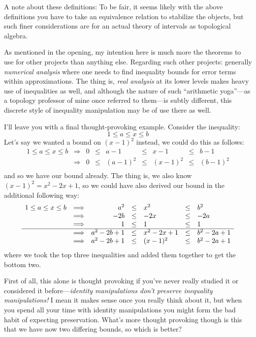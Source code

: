 \documentclass[twoside]{article}
\begin{document}
A note about these definitions: To be fair, it seems likely with the above definitions you have to take an equivalence
relation to stabilize the objects, but such finer considerations are for an actual theory of intervals as topological algebra.

\newpage

As mentioned in the opening, my intention here is much more the theorems to use for other projects than anything else.
Regarding such other projects: generally \emph{numerical analysis} where one needs to find inequality bounds for error
terms within approximations. The thing is, \emph{real analysis} at its lower levels makes heavy use of inequalities as
well, and although the nature of such ``arithmetic yoga''---as a topology professor of mine once referred to them---is
subtly different, this discrete style of inequality manipulation may be of use there as well.

I'll leave you with a final thought-provoking example. Consider the inequality:
$$ 1\le a\le x\le b $$
Let's say we wanted a bound on $ (x-1)^2 $ instead, we could do this as follows:
$$ \begin{array}{lcrclclcl}
1\le a\le x\le b	& \Longrightarrow & 0 & \le & a-1	& \le & x-1	& \le & b-1	\\
			& \Longrightarrow & 0 & \le & (a-1)^2	& \le & (x-1)^2	& \le & (b-1)^2	\\
\end{array} $$
and so we have our bound already. The thing is, we also know $ (x-1)^2=x^2-2x+1 $,
so we could have also derived our bound in the additional following way:
$$ \begin{array}{lcrclclcl}
1\le a\le x\le b	& \Longrightarrow &	a^2		& \le & x^2		& \le & b^2		\\
			& \Longrightarrow &	-2b		& \le & -2x		& \le & -2a		\\
			& \Longrightarrow &	1		& \le & 1		& \le & 1		\\\hline
			& \Longrightarrow &	a^2-2b+1	& \le & x^2-2x+1	& \le & b^2-2a+1	\\
			& \Longrightarrow &	a^2-2b+1	& \le & (x-1)^2		& \le & b^2-2a+1	\\
\end{array} $$
where we took the top three inequalities and added them together to get the bottom two.

First of all, this alone is thought provoking if you've never really studied it or considered it before---\emph{identity
manipulations don't preserve inequality manipulations!} I mean it makes sense once you really think about it, but when you
spend all your time with identity manipulations you might form the bad habit of expecting preservation. What's more thought
provoking though is this that we have now two differing bounds, so which is better?
\end{document}
